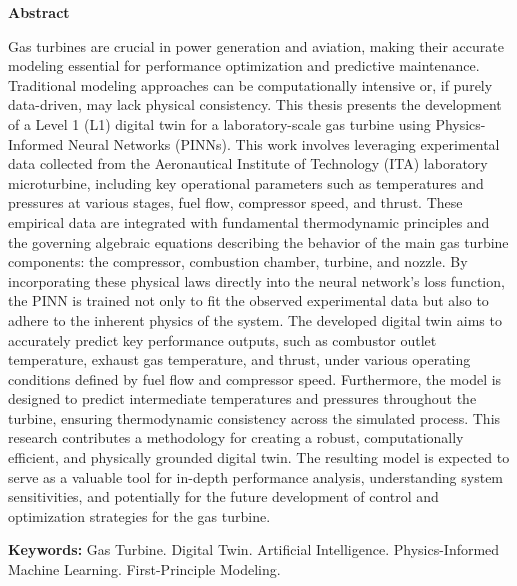 \documentclass[
  12pt,
  oneside,
  a4paper,
  english,
  brazil]{abntex2}
\renewcommand*\contentsname{Table of contents}
\newcommand\contentsname{Table of contents}
\begin{document}
\newpage{}

\begin{center}
\huge{\textbf{Abstract}}
\end{center}

Gas turbines are crucial in power generation and aviation, making their
accurate modeling essential for performance optimization and predictive
maintenance. Traditional modeling approaches can be computationally
intensive or, if purely data-driven, may lack physical consistency. This
thesis presents the development of a Level 1 (L1) digital twin for a
laboratory-scale gas turbine using Physics-Informed Neural Networks
(PINNs). This work involves leveraging experimental data collected from
the Aeronautical Institute of Technology (ITA) laboratory microturbine,
including key operational parameters such as temperatures and pressures
at various stages, fuel flow, compressor speed, and thrust. These
empirical data are integrated with fundamental thermodynamic principles
and the governing algebraic equations describing the behavior of the
main gas turbine components: the compressor, combustion chamber,
turbine, and nozzle. By incorporating these physical laws directly into
the neural network's loss function, the PINN is trained not only to fit
the observed experimental data but also to adhere to the inherent
physics of the system. The developed digital twin aims to accurately
predict key performance outputs, such as combustor outlet temperature,
exhaust gas temperature, and thrust, under various operating conditions
defined by fuel flow and compressor speed. Furthermore, the model is
designed to predict intermediate temperatures and pressures throughout
the turbine, ensuring thermodynamic consistency across the simulated
process. This research contributes a methodology for creating a robust,
computationally efficient, and physically grounded digital twin. The
resulting model is expected to serve as a valuable tool for in-depth
performance analysis, understanding system sensitivities, and
potentially for the future development of control and optimization
strategies for the gas turbine.

\vspace{1cm}

\textbf{Keywords: } Gas Turbine. Digital Twin. Artificial Intelligence.
Physics-Informed Machine Learning. First-Principle Modeling.

\newpage{}

\pdfbookmark[0]{\contentsname}{toc}
\tableofcontents*
\cleardoublepage
\end{document}
